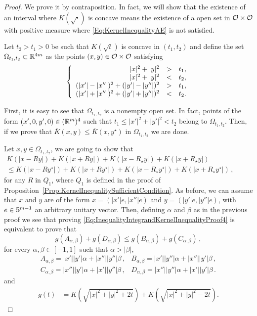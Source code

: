 \begin{proof}
We prove it by contraposition. In fact, we will show that the existence of an interval where $K(\sqrt{\cdot})$ is concave means the existence of a open set in $\mathcal{O} \times \mathcal{O}$ with positive measure where \eqref{Eq:KernelInequalityAE} is not satisfied.

Let $t_2>t_1>0$ be such that $K(\sqrt{t})$ is concave in $(t_1,t_2)$ and define the set $\Omega_{t_1,t_2}\subset \mathbb{R}^{4m}$ as the points $(x,y)\in \mathcal{O}\times \mathcal{O}$ satisfying
\begin{equation}
\label{eq:OmegaSetDefinition}
\left\{\begin{array}{rcll}
|x|^2+|y|^2&>&t_1,\\
|x|^2+|y|^2&<&t_2,\\
(|x'|-|x''|)^2+(|y'|-|y''|)^2&>&t_1,\\
(|x'|+|x''|)^2+(|y'|+|y''|)^2&<&t_2.
\end{array} \right.
\end{equation}

First, it is easy to see that $\Omega_{t_1,t_2}$ is a nonempty open set. In fact, points of the form $(x',0,y',0)\in (\mathbb{R}^m)^4$ such that $t_1\leq |x'|^2+|y'|^2<t_2$ belong to $\Omega_{t_1,t_2}$. Then, if we prove that $\overline{K}(x,y) \leq \overline{K}(x, y^\star)$ in $\Omega_{t_1,t_2}$ we are done.

Let $x,y\in \Omega_{t_1,t_2}$, we are going to show that
\begin{equation}
\label{Eq:InequalityIntegrandKernelInequalityProof4}
\begin{split}
K(|x - R y|) + K(|x + R y|) + K(|x - R_\star y|) + K(|x + R_\star y|)
\quad \quad \quad \quad \quad \quad \quad \quad
\\
\leq
K(|x - R y^\star|) + K(|x + R y^\star|)+K(|x - R_\star y^\star|) + K(|x + R_\star y^\star|)\,,
\end{split}
\end{equation}
for any $R$ in $Q_1$, where $Q_1$ is defined in the proof of Proposition~\ref{Prop:KernelInequalitySufficientCondition}. As before, we can assume that $x$ and $y$ are of the form $x = (|x'|e, |x''|e)$ and $y = (|y'|e, |y''|e)$, with $e \in \mathbb{S}^{m-1}$ an arbitrary unitary vector. Then, defining $\alpha$ and $\beta$ as in the previous proof we see that proving \eqref{Eq:InequalityIntegrandKernelInequalityProof4} is equivalent to prove that
\begin{equation}
\label{Eq:InequalityIntegrandKernelInequalityProof5}
g(A_{\alpha,\beta}) + g(D_{\alpha,\beta}) \leq g(B_{\alpha,\beta}) + g(C_{\alpha,\beta})\,,
\end{equation}
for every $\alpha, \beta \in [-1,1]$ such that $\alpha>|\beta|$,
$$
\begin{array}{cc}
A_{\alpha,\beta} = |x'||y'|  \alpha + |x''||y''|\beta \,, &
B_{\alpha,\beta} = |x'||y''| \alpha + |x''||y'| \beta \,, \\
C_{\alpha,\beta} = |x''||y'| \alpha + |x'||y''| \beta \,, &
D_{\alpha,\beta} = |x''||y''|\alpha + |x'||y'|  \beta \,.
\end{array}
$$
and
\begin{align*}
g(t) &= K\left( \sqrt{|x|^2+|y|^2+2t} \right) + K\left( \sqrt{|x|^2+|y|^2-2t} \right).
\end{align*}


\end{proof}
